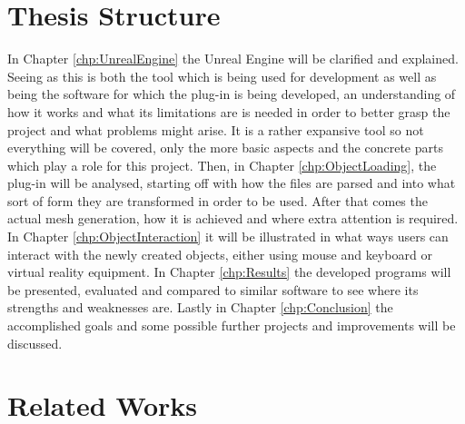 \section{Thesis Structure}
In Chapter \ref{chp:UnrealEngine} the Unreal Engine will be clarified and explained. Seeing as this is both the tool which is being used for development as well as being the software for which the plug-in is being developed, an understanding of how it works and what its limitations are is needed in order to better grasp the project and what problems might arise. It is a rather expansive tool so not everything will be covered, only the more basic aspects and the concrete parts which play a role for this project. Then, in Chapter \ref{chp:ObjectLoading}, the plug-in will be analysed, starting off with how the files are parsed and into what sort of form they are transformed in order to be used. After that comes the actual mesh generation, how it is achieved and where extra attention is required. In Chapter \ref{chp:ObjectInteraction} it will be illustrated in what ways users can interact with the newly created objects, either using mouse and keyboard or virtual reality equipment. In Chapter \ref{chp:Results} the developed programs will be presented, evaluated and compared to similar software to see where its strengths and weaknesses are. Lastly in Chapter \ref{chp:Conclusion} the accomplished goals and some possible further projects and improvements will be discussed.

\section{Related Works}


